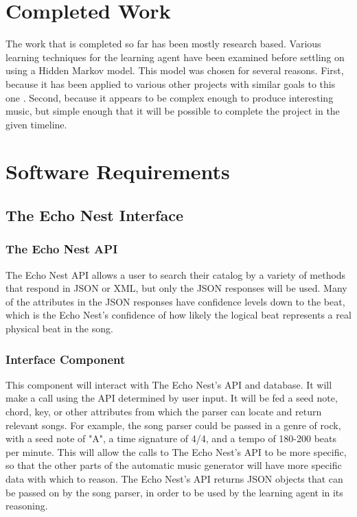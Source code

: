 \documentclass{article}
\begin{document}
\section{Completed Work}
The work that is completed so far has been mostly research based. Various learning techniques for the learning agent have been examined before settling on using a Hidden Markov model. This model was chosen for several reasons. First, because it has been applied to various other projects with similar goals to this one \cite{761266, 1394661} . Second, because it appears to be complex enough to produce interesting music, but simple enough that it will be possible to complete the project in the given timeline.\\

\section{Software Requirements}
\subsection{The Echo Nest Interface}

\subsubsection{The Echo Nest API}
The Echo Nest API allows a user to search their catalog by a variety of methods that respond in JSON or XML, but only the JSON responses will be used.  Many of the attributes in the JSON responses have confidence levels down to the beat, which is the Echo Nest's confidence of how likely the logical beat represents a real physical beat in the song.

\subsubsection{Interface Component}
This component will interact with The Echo Nest's API and database. It will make a call using the API determined by user input. It will be fed a seed note, chord, key, or other attributes from which the parser can locate and return relevant songs. For example, the song parser could be passed in a genre of rock, with a seed note of "A", a time signature of 4/4, and a tempo of 180-200 beats per minute. This will allow the calls to The Echo Nest's API to be more specific, so that the other parts of the automatic music generator will have more specific data with which to reason. The Echo Nest's API returns JSON objects that can be passed on by the song parser, in order to be used by the learning agent in its reasoning.
\end{document}
